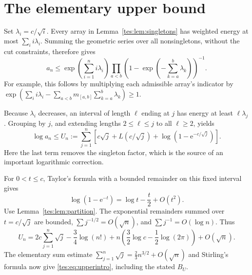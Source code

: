 \documentclass[11pt,a4paper]{article}
\theoremstyle{remark}\newtheorem{remark}[theorem]{Remark}
\newcommand{\ee}{\mathrm e}\newcommand{\dd}{\,\mathrm d}
\numberwithin{equation}{section}
\begin{document}
\section{The elementary upper bound}\label{tes:sec:upper}
Set $\lambda_i=c/\sqrt i$. Every array in Lemma~\ref{tes:lem:singletons} has weighted energy at most $\sum_i i\lambda_i$. Summing the geometric series over all nonsingletons, without the cut constraints, therefore gives
\begin{equation}\label{tes:eq:boltzupper}
a_n\le\exp\left(\sum_{i=1}^n i\lambda_i\right)
\prod_{a<b}\left(1-\exp\left(-\sum_{k=a}^b\lambda_k\right)\right)^{-1}.
\end{equation}
For example, this follows by multiplying each admissible array's indicator by
$\exp(\sum_i i\lambda_i-\sum_{a<b}m_{[a,b]}\sum_{k=a}^b\lambda_k)\ge1$.

Because $\lambda_i$ decreases, an interval of length $\ell$ ending at $j$ has energy at least $\ell\lambda_j$. Grouping by $j$, and extending lengths $2\le\ell\le j$ to all $\ell\ge2$, yields
\begin{equation}\label{tes:eq:Un}
\log a_n\le U_n:=\sum_{j=1}^n\left[
c\sqrt j+L(c/\sqrt j)+\log(1-\ee^{-c/\sqrt j})\right].
\end{equation}
Here the last term removes the singleton factor, which is the source of an important logarithmic correction.

For $0<t\le c$, Taylor's formula with a bounded remainder on this fixed interval gives
\[
\log(1-\ee^{-t})=\log t-\frac t2+O(t^2).
\]
Use Lemma~\ref{tes:lem:partition}. The exponential remainders summed over $t=c/\sqrt j$ are bounded, $\sum j^{-1/2}=O(\sqrt n)$, and $\sum j^{-1}=O(\log n)$. Thus
\begin{equation}\label{tes:eq:upperfactorial}
U_n=2c\sum_{j=1}^n\sqrt j-\frac34\log(n!)
+n\left(\frac32\log c-\frac12\log(2\pi)\right)+O(\sqrt n).
\end{equation}
The elementary sum estimate $\sum_{j=1}^n\sqrt j=\tfrac23n^{3/2}+O(\sqrt n)$ and Stirling's formula now give \eqref{tes:eq:upperintro}, including the stated $B_U$.
\end{document}
